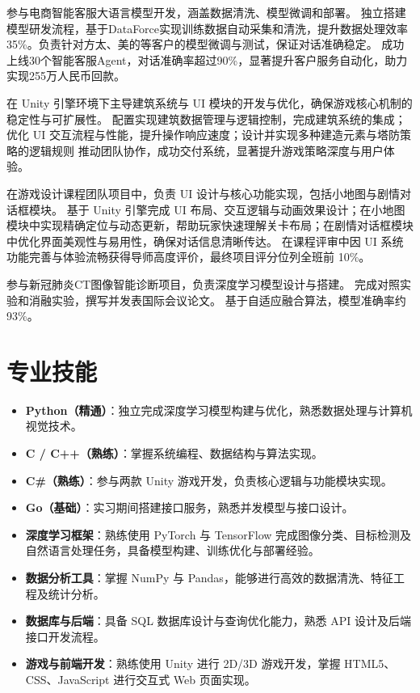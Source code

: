 \documentclass{resume}
\begin{document}
\Content
{参与电商智能客服大语言模型开发，涵盖数据清洗、模型微调和部署。}
{独立搭建模型研发流程，基于DataForce实现训练数据自动采集和清洗，提升数据处理效率35\%。负责针对方太、美的等客户的模型微调与测试，保证对话准确稳定。}
{成功上线30个智能客服Agent，对话准确率超过90\%，显著提升客户服务自动化，助力实现255万人民币回款。}

\Content
{在 Unity 引擎环境下主导建筑系统与 UI 模块的开发与优化，确保游戏核心机制的稳定性与可扩展性。}
{配置实现建筑数据管理与逻辑控制，完成建筑系统的集成；优化 UI 交互流程与性能，提升操作响应速度；设计并实现多种建造元素与塔防策略的逻辑规则}
{推动团队协作，成功交付系统，显著提升游戏策略深度与用户体验。}

\Content
{在游戏设计课程团队项目中，负责 UI 设计与核心功能实现，包括小地图与剧情对话框模块。}
{基于 Unity 引擎完成 UI 布局、交互逻辑与动画效果设计；在小地图模块中实现精确定位与动态更新，帮助玩家快速理解关卡布局；在剧情对话框模块中优化界面美观性与易用性，确保对话信息清晰传达。}
{在课程评审中因 UI 系统功能完善与体验流畅获得导师高度评价，最终项目评分位列全班前 10\%。}

\Content
{参与新冠肺炎CT图像智能诊断项目，负责深度学习模型设计与搭建。}
{完成对照实验和消融实验，撰写并发表国际会议论文。}
{基于自适应融合算法，模型准确率约93\%。}

\section{专业技能}
\begin{itemize}[leftmargin=2em]
  \item \textbf{Python（精通）}：独立完成深度学习模型构建与优化，熟悉数据处理与计算机视觉技术。
  \item \textbf{C / C++（熟练）}：掌握系统编程、数据结构与算法实现。
  \item \textbf{C\#（熟练）}：参与两款 Unity 游戏开发，负责核心逻辑与功能模块实现。
  \item \textbf{Go（基础）}：实习期间搭建接口服务，熟悉并发模型与接口设计。
\end{itemize}
\begin{itemize}[leftmargin=2em]
  \item \textbf{深度学习框架}：熟练使用 PyTorch 与 TensorFlow 完成图像分类、目标检测及自然语言处理任务，具备模型构建、训练优化与部署经验。
  \item \textbf{数据分析工具}：掌握 NumPy 与 Pandas，能够进行高效的数据清洗、特征工程及统计分析。
  \item \textbf{数据库与后端}：具备 SQL 数据库设计与查询优化能力，熟悉 API 设计及后端接口开发流程。
  \item \textbf{游戏与前端开发}：熟练使用 Unity 进行 2D/3D 游戏开发，掌握 HTML5、CSS、JavaScript 进行交互式 Web 页面实现。
\end{itemize}
\end{document}

